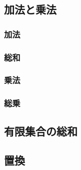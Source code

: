 \documentclass[autodetect-engine,dvipdfmx-if-dvi,ja=standard,a4paper,12pt]{bxjsbook}
\begin{document}
				\subsection{加法と乗法}
			        \subsubsection{加法}
			        \subsubsection{総和}
			        \subsubsection{乗法}
			        \subsubsection{総乗}
	     	    \subsection{有限集合の総和}
     	 		\subsection{置換}
\end{document}
